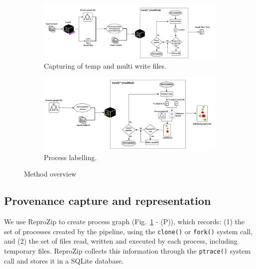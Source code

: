 \documentclass[a4paper,num-refs]{oup-contemporary}
\newcommand{\reprozip}[0]{ReproZip\xspace}
\begin{document}
\begin{figure}
  \centering
  \begin{subfigure}{\columnwidth}
    \centering
    \includegraphics[width=1\columnwidth]{images/Slide2}
    \caption{Capturing of temp and multi write files.}
    \label{fig:overview-capturing}
  \end{subfigure}
   \begin{subfigure}{\columnwidth}
    \centering
     \includegraphics[width=1\columnwidth]{images/Slide1}
     \caption{Process labelling.}
     \label{fig:overview-labelling}
   \end{subfigure}
   \caption{Method overview}
   \label{fig:overview}
  \end{figure}

\subsection{Provenance capture and representation}

We use \reprozip to create process graph (Fig.~\ref{fig:overview-capturing} - (P)), 
which records: (1) the set of processes created by the
pipeline, using the \texttt{clone()} or \texttt{fork()} system call, and
(2) the set of files read, written and executed by each process, including
temporary files. \reprozip collects this information through the
\texttt{ptrace()} system call and stores it in a SQLite database.
\end{document}
